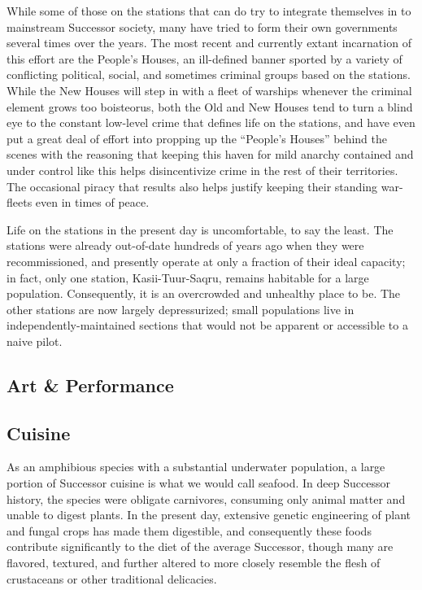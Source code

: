 \documentclass[11pt]{report}
\begin{document}
    While some of those on the stations that can do try to integrate themselves in to mainstream Successor society, many have tried to form their own governments several times over the years. The most recent and currently extant incarnation of this effort are the People's Houses, an ill-defined banner sported by a variety of conflicting political, social, and sometimes criminal groups based on the stations. While the New Houses will step in with a fleet of warships whenever the criminal element grows too boisteorus, both the Old and New Houses tend to turn a blind eye to the constant low-level crime that defines life on the stations, and have even put a great deal of effort into propping up the ``People's Houses'' behind the scenes with the reasoning that keeping this haven for mild anarchy contained and under control like this helps disincentivize crime in the rest of their territories. The occasional piracy that results also helps justify keeping their standing war-fleets even in times of peace.

    Life on the stations in the present day is uncomfortable, to say the least. The stations were already out-of-date hundreds of years ago when they were recommissioned, and presently operate at only a fraction of their ideal capacity; in fact, only one station, Kasii-Tuur-Saqru, remains habitable for a large population. Consequently, it is an overcrowded and unhealthy place to be. The other stations are now largely depressurized; small populations live in independently-maintained sections that would not be apparent or accessible to a naive pilot.

    \subsection{Art \& Performance}
    \subsection{Cuisine}
    As an amphibious species with a substantial underwater population, a large portion of Successor cuisine is what we would call seafood. In deep Successor history, the species were obligate carnivores, consuming only animal matter and unable to digest plants. In the present day, extensive genetic engineering of plant and fungal crops has made them digestible, and consequently these foods contribute significantly to the diet of the average Successor, though many are flavored, textured, and further altered to more closely resemble the flesh of crustaceans or other traditional delicacies.
\end{document}
